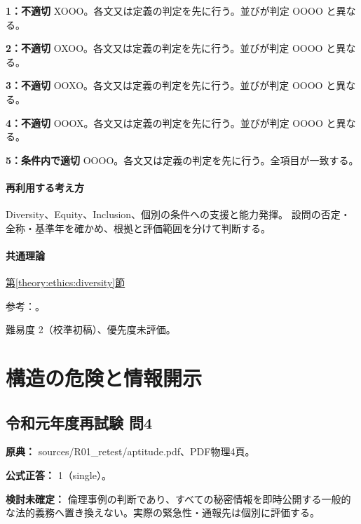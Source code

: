\noindent\textbf{1：不適切} XOOO。各文又は定義の判定を先に行う。並びが判定 OOOO と異なる。\par

\noindent\textbf{2：不適切} OXOO。各文又は定義の判定を先に行う。並びが判定 OOOO と異なる。\par

\noindent\textbf{3：不適切} OOXO。各文又は定義の判定を先に行う。並びが判定 OOOO と異なる。\par

\noindent\textbf{4：不適切} OOOX。各文又は定義の判定を先に行う。並びが判定 OOOO と異なる。\par

\noindent\textbf{5：条件内で適切} OOOO。各文又は定義の判定を先に行う。全項目が一致する。\par

\paragraph{再利用する考え方} Diversity、Equity、Inclusion、個別の条件への支援と能力発揮。 設問の否定・全称・基準年を確かめ、根拠と評価範囲を分けて判断する。

\paragraph{共通理論} \hyperref[theory:ethics:diversity]{第\ref*{theory:ethics:diversity}節}

\par 参考：\cite{eth54_dei2025}。

\par 難易度 2（校準初稿）、優先度未評価。

\section{構造の危険と情報開示}

\subsection{令和元年度再試験 問4}
\label{q:r01-ret-apt-04}

\noindent\textbf{原典：} sources/R01\_retest/aptitude.pdf、PDF物理4頁。

\textbf{公式正答：} 1（single）。

\par\textbf{検討未確定：} 倫理事例の判断であり、すべての秘密情報を即時公開する一般的な法的義務へ置き換えない。実際の緊急性・通報先は個別に評価する。

